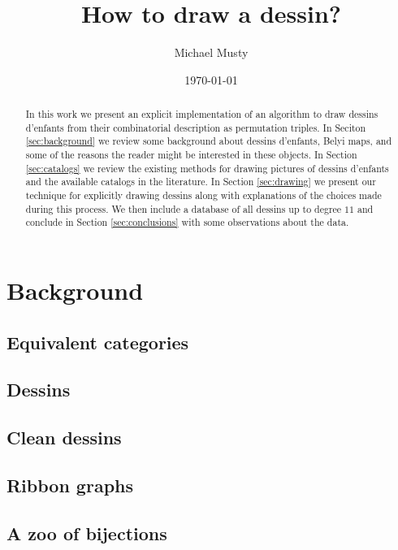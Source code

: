 \documentclass{amsart}
\numberwithin{equation}{section}
\theoremstyle{definition}
\theoremstyle{remark}
\begin{document}
\title{How to draw a dessin?}

\author{Michael Musty}
\address{ICERM, 121 S Main Street, Providence, RI 02903, Fall 2019}

\date{\today}

\begin{abstract}
  In this work we present an explicit implementation
  of an algorithm to draw dessins d'enfants from their
  combinatorial description as permutation triples.
  In Seciton \ref{sec:background}
  we review some background about dessins d'enfants,
  Belyi maps, and some of the reasons the reader
  might be interested in these objects.
  In Section \ref{sec:catalogs}
  we review the existing methods for drawing
  pictures of dessins d'enfants and the available
  catalogs in the literature.
  In Section \ref{sec:drawing}
  we present our technique for explicitly drawing
  dessins along with explanations of the choices
  made during this process.
  We then include a database
  of all dessins up to degree $11$
  and conclude in Section \ref{sec:conclusions}
  with some observations about the data.
\end{abstract}

\maketitle
\tableofcontents

\section{Background}{\label{sec:background}
  \subsection{Equivalent categories}{
    \subsection{Dessins}{
    }
    \subsection{Clean dessins}{
    }
    \subsection{Ribbon graphs}{
    }
    \subsection{A zoo of bijections}{
    }
  }
}
\end{document}

